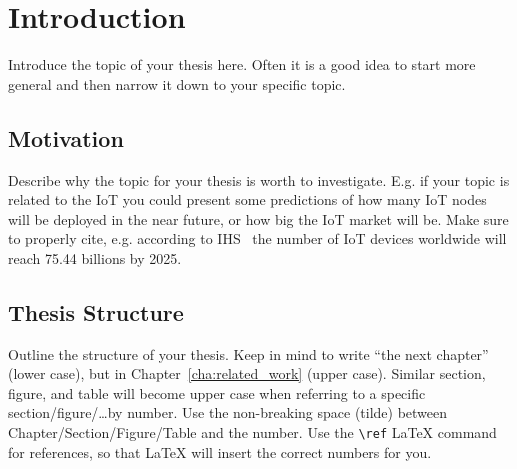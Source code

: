 \chapter{Introduction}
\label{cha:introduction}
Introduce the topic of your thesis here.
Often it is a good idea to start more general and then narrow it down to your specific topic.


\section{Motivation}
\label{sec:motivation}
Describe why the topic for your thesis is worth to investigate.
E.g. if your topic is related to the \gls{IoT} you could present some predictions of how many \gls{IoT} nodes will be deployed in the near future, or how big the \gls{IoT} market will be.
Make sure to properly cite, e.g. according to IHS~\cite{ihs:2016:iotdevices} the number of \gls{IoT} devices worldwide will reach \num{75.44} billions by 2025.

\section{Thesis Structure}
\label{sec:structure}
Outline the structure of your thesis.
Keep in mind to write ``the next chapter'' (lower case), but in Chapter~\ref{cha:related_work} (upper case).
Similar section, figure, and table will become upper case when referring to a specific section/figure/\ldots by number.
Use the non-breaking space (tilde) between Chapter/Section/Figure/Table and the number.
Use the \texttt{\textbackslash{}ref} LaTeX command for references, so that LaTeX will insert the correct numbers for you.
